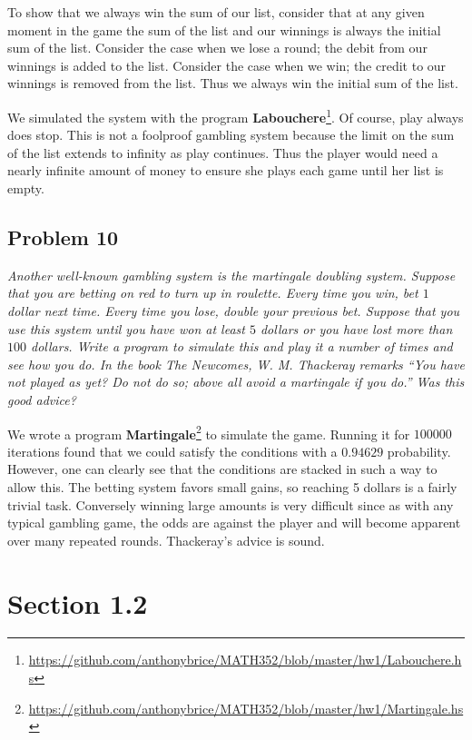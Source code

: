 \documentclass{tufte-handout}
\begin{document}
To show that we always win the sum of our list, consider that at any
given moment in the game the sum of the list and our winnings is
always the initial sum of the list. Consider the case when we lose a
round; the debit from our winnings is added to the list. Consider the
case when we win; the credit to our winnings is removed from the
list. Thus we always win the initial sum of the list.

We simulated the system with the program \textbf{Labouchere}\footnote{
  \url{https://github.com/anthonybrice/MATH352/blob/master/hw1/Labouchere.hs}}.
Of course, play always does stop. This is not a foolproof gambling system
because the limit on the sum of the list extends to infinity as play
continues. Thus the player would need a nearly infinite amount of
money to ensure she plays each game until her list is empty.

\subsection{Problem 10}
\begin{description}
\item \textit{Another well-known gambling system is the martingale
    doubling system. Suppose that you are betting on red to turn up in
    roulette. Every time you win, bet $1$ dollar next time. Every time
    you lose, double your previous bet. Suppose that you use this
    system until you have won at least $5$ dollars or you have lost
    more than $100$ dollars. Write a program to simulate this and play
    it a number of times and see how you do. In the book \emph{The
      Newcomes}, W. M. Thackeray remarks ``You have not played as yet?
    Do not do so; above all avoid a martingale if you do.'' Was this
    good advice?}
\end{description}

We wrote a program \textbf{Martingale}\footnote{
  \url{https://github.com/anthonybrice/MATH352/blob/master/hw1/Martingale.hs}}
to simulate the game. Running it for $100000$ iterations found that we
could satisfy the conditions with a $0.94629$ probability. However,
one can clearly see that the conditions are stacked in such a way to
allow this. The betting system favors small gains, so reaching 5
dollars is a fairly trivial task. Conversely winning large amounts is
very difficult since as with any typical gambling game, the odds are
against the player and will become apparent over many repeated
rounds. Thackeray's advice is sound.

\section{Section 1.2}
\end{document}
